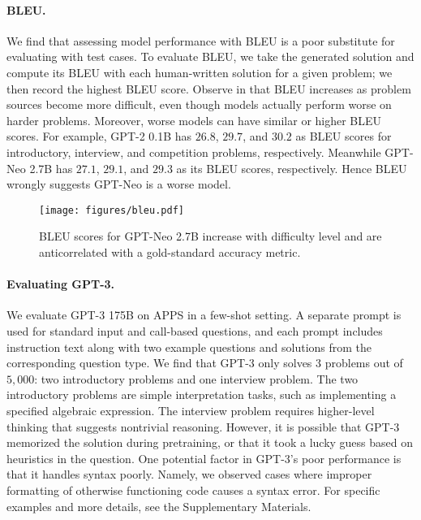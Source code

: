 \documentclass{article}
\begin{document}
\paragraph{BLEU.} We find that assessing model performance with BLEU is a poor substitute for evaluating with test cases. To evaluate BLEU, we take the generated solution and compute its BLEU with each human-written solution for a given problem; we then record the highest BLEU score. Observe in  that BLEU increases as problem sources become more difficult, even though models actually perform worse on harder problems. Moreover, worse models can have similar or higher BLEU scores. For example, GPT-2 0.1B has $26.8$, $29.7$, and $30.2$ as BLEU scores for introductory, interview, and competition problems, respectively. Meanwhile GPT-Neo 2.7B has $27.1$, $29.1$, and $29.3$ as its BLEU scores, respectively. Hence BLEU wrongly suggests GPT-Neo is a worse model. 











\begin{wrapfigure}{r}{0.5\textwidth}
    \centering
    \texttt{[image: figures/bleu.pdf]}
    \caption{BLEU scores for GPT-Neo 2.7B increase with difficulty level and are anticorrelated with a gold-standard accuracy metric.}
    \label{fig:bleu}
\end{wrapfigure}

\paragraph{Evaluating GPT-3.}
We evaluate GPT-3 175B on APPS in a few-shot setting. A separate prompt is used for standard input and call-based questions, and each prompt includes instruction text along with two example questions and solutions from the corresponding question type. We find that GPT-3 only solves $3$ problems out of $5,\!000$: two introductory problems and one interview problem. The two introductory problems are simple interpretation tasks, such as implementing a specified algebraic expression. The interview problem requires higher-level thinking that suggests nontrivial reasoning. However, it is possible that GPT-3 memorized the solution during pretraining, or that it took a lucky guess based on heuristics in the question. One potential factor in GPT-3's poor performance is that it handles syntax poorly. Namely, we observed cases where improper formatting of otherwise functioning code causes a syntax error. For specific examples and more details, see the Supplementary Materials.
\end{document}

